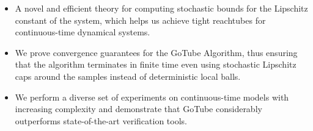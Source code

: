 \documentclass[letterpaper]{article} %
\begin{document}
\begin{itemize}
    \item A novel and efficient theory for computing stochastic bounds for the Lipschitz constant of the system, which helps us achieve tight reachtubes for continuous-time dynamical systems.
    \item We prove convergence guarantees for the GoTube Algorithm, thus ensuring that the algorithm terminates in finite time even using stochastic Lipschitz caps around the samples instead of deterministic local balls.
    \item We perform a diverse set of experiments on continuous-time models with increasing complexity and demonstrate that GoTube considerably outperforms state-of-the-art verification tools.
\end{itemize}


\end{document}
